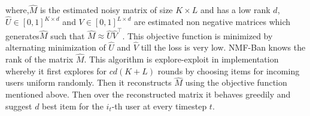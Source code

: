 where,$ \hat{M}$ is the estimated noisy matrix of size $K \times L$ and  has a low rank $d$, $\hat{U} \in [0,1]^{K \times d}$ and $V \in [0,1]^{L \times d}$ are estimated non negative matrices which  generates$ \hat{M}$ such that $\hat{M} \approx \hat{U}\hat{V}^{\intercal}$. This objective function is minimized by alternating minimization of $\hat{U}$ and $\hat{V}$ till the loss is very low. NMF-Ban knows the rank of the matrix $\hat{M}$. This algorithm is explore-exploit in implementation whereby it first explores for $cd(K + L)$ rounds by choosing items for incoming users uniform randomly. Then it reconstructs $\hat{M}$ using the objective function mentioned above. Then over the reconstructed matrix it behaves greedily and suggest $d$ best item for the $i_t$-th user at every timestep $t$. 



%
%
%


